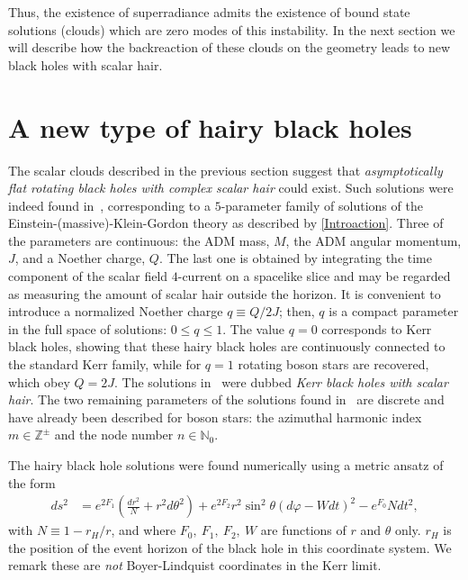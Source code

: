 Thus, the existence of superradiance admits the existence of bound state solutions (clouds) which are zero modes of this instability.
In the next section we will describe how the backreaction of these clouds on the geometry leads to new black holes with scalar hair.

\section{A new type of hairy black holes}
\label{sec:HBHs}
The scalar clouds described in the previous section suggest that \textit{asymptotically flat rotating black holes with complex scalar hair} could exist.
Such solutions were indeed found in~\cite{Herdeiro:2014goa}, corresponding to a $5$-parameter family of solutions of the Einstein-(massive)-Klein-Gordon theory as described by \eqref{Introaction}.
Three of the parameters are continuous: the ADM mass, $M$, the ADM angular momentum, $J$, and a Noether charge, $Q$.
The last one is obtained by integrating the time component of the scalar field $4$-current on a spacelike slice and may be regarded as measuring the amount of scalar hair outside the horizon.
It is convenient to introduce a normalized Noether charge $q\equiv Q/2J$; then, $q$ is a compact parameter in the full space of solutions: $0\le q\le 1$.
The value $q=0$ corresponds to Kerr black holes, showing that these hairy black holes are continuously connected to the standard Kerr family, while for $q=1$ rotating boson stars are recovered, which obey $Q=2J$.
The solutions in~\cite{Herdeiro:2014goa} were dubbed \textit{Kerr black holes with scalar hair}.
The two remaining parameters of the solutions found in~\cite{Herdeiro:2014goa} are discrete and have already been described for boson stars: the azimuthal harmonic index $m\in \mathbb{Z}^\pm$ and the node number $n\in \mathbb{N}_0$. 

The hairy black hole solutions were found numerically using a metric ansatz of the form
\begin{align}
  ds^2 &= e^{2F_1}\left( \frac{dr^2}{N} + r^2d\theta^2 \right) + e^{2F_2}r^2\sin^2\theta \left( d\varphi - Wdt \right)^2 - e^{F_0}Ndt^2,
  \label{eqn:HBH-ansatz}
\end{align}
with $N\equiv 1-r_H/r$, and where $F_0,~F_1,~F_2,~W$ are functions of $r$ and $\theta$ only.
$r_H$ is the position of the event horizon of the black hole in this coordinate system.
We remark these are \textit{not} Boyer-Lindquist coordinates in the Kerr limit. 

